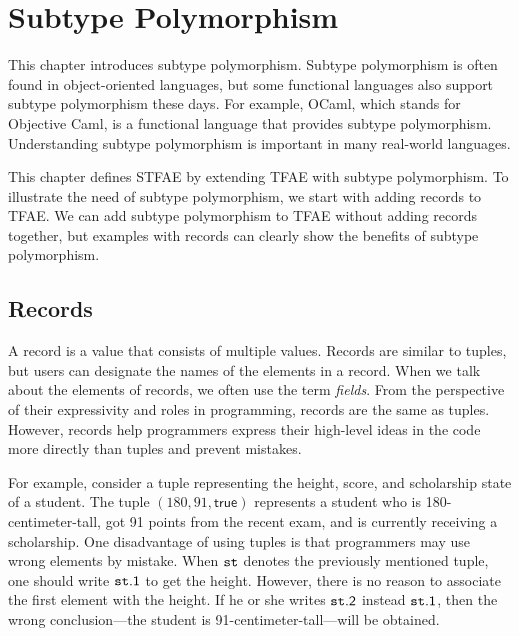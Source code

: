 
\chapter{Subtype Polymorphism}

\renewcommand{\plang}{\textsf{TFAE}\xspace}
\renewcommand{\Lang}{\textsf{STFAE}\xspace}

This chapter introduces subtype polymorphism. Subtype polymorphism is often
found in object-oriented languages, but some functional languages also support
subtype polymorphism these days. For example, OCaml, which stands for Objective
Caml, is a functional language that provides subtype polymorphism. Understanding
subtype polymorphism is important in many real-world languages.

This chapter
defines \Lang by extending \plang with subtype polymorphism. To illustrate the
need of subtype polymorphism, we start with adding records to \plang. We can add
subtype polymorphism to \plang without adding records together, but examples with
records can clearly show the benefits of subtype polymorphism.

\section{Records}

A record is a value that consists of multiple values. Records are similar to tuples,
but users can designate the names of the elements in a record. When we talk
about the elements of records, we often use the term
\textit{fields}. From the perspective
of their expressivity and roles in programming, records are the same as tuples.
However, records help programmers express their high-level ideas in the code
more directly than tuples and prevent mistakes.

For example,
consider a tuple representing the height, score, and scholarship state of a
student. The tuple $(180,91, \textsf{true})$ represents a student who is
180-centimeter-tall, got 91 points from the recent exam, and is currently
receiving a scholarship. One disadvantage of using tuples is that programmers
may use wrong elements by mistake. When $\texttt{st}$ denotes the previously
mentioned tuple, one should write $\texttt{st}\textsf{.1}$ to get the height.
However, there is no reason to associate the first element with the height. If he or
she writes $\texttt{st}\textsf{.2}$ instead $\texttt{st}\textsf{.1}$, then the wrong
conclusion---the student is 91-centimeter-tall---will be obtained.

